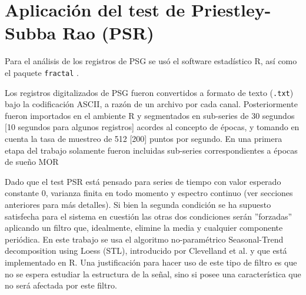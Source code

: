 
\section{Aplicaci\'on del test de Priestley-Subba Rao (PSR)}

Para el an\'alisis de los registros de PSG se us\'o el software estad\'istico R\cite{R_citar}, 
as\'i como el paquete \texttt{fractal} \cite{R_fractal}.

Los registros digitalizados de PSG fueron convertidos a formato de texto (\texttt{.txt}) bajo
la codificaci\'on ASCII, a raz\'on de un archivo por cada canal. Posteriormente fueron importados
en el ambiente R y segmentados en sub-series de 30 segundos [10 segundos para algunos 
registros] acordes al concepto de \'epocas, y tomando en cuenta la tasa de muestreo de 512 [200]
puntos por segundo. 
En una primera etapa del trabajo solamente fueron incluidas sub-series correspondientes a
\'epocas de sue\~no MOR

Dado que
el test PSR est\'a pensado para
series de tiempo con valor esperado constante 0, varianza finita en todo momento y espectro
continuo (ver secciones anteriores para m\'as detalles). Si bien la 
segunda condici\'on se 
ha supuesto satisfecha para el sistema en cuesti\'on
las otras dos condiciones ser\'an ''forzadas'' aplicando  un
filtro que, idealmente, elimine la media y cualquier componente peri\'odica.
En este trabajo se usa el algoritmo no-param\'etrico Seasonal-Trend decomposition using Loess 
(STL), introducido por Clevelland et al. \cite{Cleveland1990} y que est\'a implementado en R.
Una justificaci\'on para hacer uso de este tipo de filtro es 
que no se espera estudiar la estructura de la se\~nal, sino si posee una caracter\'istica
que no ser\'a afectada por este filtro.

